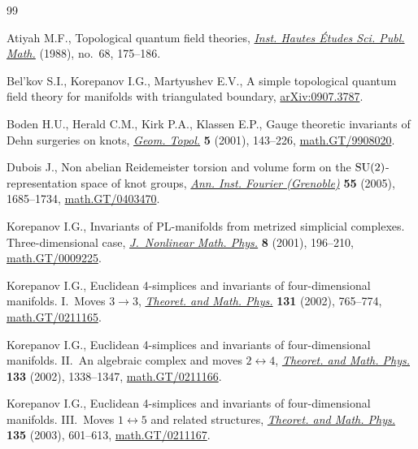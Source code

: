 \documentclass[pdftex]{sigma}
\begin{document}
\begin{thebibliography}{99}

\footnotesize\itemsep=0pt

Atiyah M.F.,
Topological quantum f\/ield theories,
\href{http://www.numdam.org/item?id=PMIHES_1988__68__175_0}{{\it Inst. Hautes \'Etudes Sci. Publ. Math.}}  (1988), no.~68, 175--186.

Bel'kov S.I., Korepanov I.G., Martyushev E.V.,
A simple topological quantum f\/ield theory for manifolds with triangulated boundary,
\href{http://arxiv.org/abs/0907.3787}{arXiv:0907.3787}.

Boden H.U., Herald C.M., Kirk P.A., Klassen E.P.,
Gauge theoretic invariants of Dehn surgeries on knots,
\href{http://dx.doi.org/10.2140/gt.2001.5.143}{{\it Geom. Topol.}} {\bf 5} (2001), 143--226,
\href{http://arxiv.org/abs/math.GT/9908020}{math.GT/9908020}.

Dubois J.,
Non abelian Reidemeister torsion and volume form on the ${\rm SU}(2)$-representation space of knot groups,
\href{http://aif.cedram.org/item?id=AIF_2005__55_5_1685_0}{{\it Ann. Inst. Fourier (Grenoble)}} {\bf 55} (2005), 1685--1734,
\href{http://arxiv.org/abs/math.GT/0403470}{math.GT/0403470}.

Korepanov I.G.,
Invariants of PL-manifolds from metrized simplicial complexes. Three-dimensional case,
\href{http://dx.doi.org/10.2991/jnmp.2001.8.2.3}{{\it J.~Nonlinear Math. Phys.}} {\bf 8} (2001), 196--210,
\href{http://arxiv.org/abs/math.GT/0009225}{math.GT/0009225}.

Korepanov I.G.,
Euclidean 4-simplices and invariants of four-dimensional manifolds. I.~Moves $3\to 3$,
\href{http://dx.doi.org/10.1023/A:1015971322591}{{\it Theoret. and Math. Phys.}} {\bf 131} (2002), 765--774,
\href{http://arxiv.org/abs/math.GT/0211165}{math.GT/0211165}.

Korepanov I.G.,
Euclidean 4-simplices and invariants of four-dimensional manifolds. II.~An algebraic complex and moves $2\leftrightarrow 4$,
\href{http://dx.doi.org/10.1023/A:1020689829261}{{\it Theoret. and Math. Phys.}} {\bf 133} (2002), 1338--1347,
\href{http://arxiv.org/abs/math.GT/0211166}{math.GT/0211166}.

Korepanov I.G.,
Euclidean 4-simplices and invariants of four-dimensional manifolds. III.~Moves $1\leftrightarrow 5$ and related structures,
\href{http://dx.doi.org/10.1023/A:1023625313495}{{\it Theoret. and Math. Phys.}} {\bf 135} (2003), 601--613,
\href{http://arxiv.org/abs/math.GT/0211167}{math.GT/0211167}.


\end{thebibliography}
\end{document}
